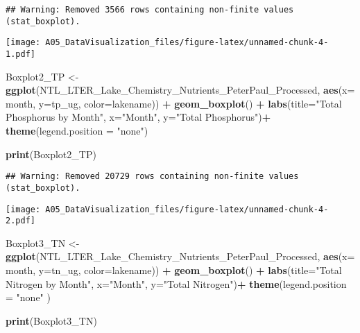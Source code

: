 \documentclass[
]{article}
\newenvironment{Shaded}{\begin{snugshade}}{\end{snugshade}}
\newcommand{\DataTypeTok}[1]{\textcolor[rgb]{0.13,0.29,0.53}{#1}}
\newcommand{\KeywordTok}[1]{\textcolor[rgb]{0.13,0.29,0.53}{\textbf{#1}}}
\newcommand{\NormalTok}[1]{#1}
\newcommand{\OperatorTok}[1]{\textcolor[rgb]{0.81,0.36,0.00}{\textbf{#1}}}
\newcommand{\StringTok}[1]{\textcolor[rgb]{0.31,0.60,0.02}{#1}}
\begin{document}
\begin{verbatim}
## Warning: Removed 3566 rows containing non-finite values (stat_boxplot).
\end{verbatim}

\texttt{[image: A05\_DataVisualization\_files/figure-latex/unnamed-chunk-4-1.pdf]}

\begin{Shaded}
\begin{Highlighting}[]
\NormalTok{Boxplot2_TP <-}\StringTok{ }\KeywordTok{ggplot}\NormalTok{(NTL_LTER_Lake_Chemistry_Nutrients_PeterPaul_Processed,}
                      \KeywordTok{aes}\NormalTok{(}\DataTypeTok{x=}\NormalTok{ month, }\DataTypeTok{y=}\NormalTok{tp_ug, }\DataTypeTok{color=}\NormalTok{lakename)) }\OperatorTok{+}
\StringTok{  }\KeywordTok{geom_boxplot}\NormalTok{() }\OperatorTok{+}
\StringTok{  }\KeywordTok{labs}\NormalTok{(}\DataTypeTok{title=}\StringTok{"Total Phosphorus by Month"}\NormalTok{,}
  \DataTypeTok{x=}\StringTok{"Month"}\NormalTok{,}
  \DataTypeTok{y=}\StringTok{"Total Phosphorus"}\NormalTok{)}\OperatorTok{+}
\StringTok{  }\KeywordTok{theme}\NormalTok{(}\DataTypeTok{legend.position =} \StringTok{"none"}\NormalTok{)}

\KeywordTok{print}\NormalTok{(Boxplot2_TP)}
\end{Highlighting}
\end{Shaded}

\begin{verbatim}
## Warning: Removed 20729 rows containing non-finite values (stat_boxplot).
\end{verbatim}

\texttt{[image: A05\_DataVisualization\_files/figure-latex/unnamed-chunk-4-2.pdf]}

\begin{Shaded}
\begin{Highlighting}[]
\NormalTok{Boxplot3_TN <-}\StringTok{ }\KeywordTok{ggplot}\NormalTok{(NTL_LTER_Lake_Chemistry_Nutrients_PeterPaul_Processed,}
                      \KeywordTok{aes}\NormalTok{(}\DataTypeTok{x=}\NormalTok{ month, }\DataTypeTok{y=}\NormalTok{tn_ug, }\DataTypeTok{color=}\NormalTok{lakename)) }\OperatorTok{+}
\StringTok{  }\KeywordTok{geom_boxplot}\NormalTok{() }\OperatorTok{+}
\StringTok{  }\KeywordTok{labs}\NormalTok{(}\DataTypeTok{title=}\StringTok{"Total Nitrogen by Month"}\NormalTok{,}
  \DataTypeTok{x=}\StringTok{"Month"}\NormalTok{,}
  \DataTypeTok{y=}\StringTok{"Total Nitrogen"}\NormalTok{)}\OperatorTok{+}
\StringTok{  }\KeywordTok{theme}\NormalTok{(}\DataTypeTok{legend.position =} \StringTok{"none"}\NormalTok{ )}

\KeywordTok{print}\NormalTok{(Boxplot3_TN)}
\end{Highlighting}
\end{Shaded}
\end{document}
